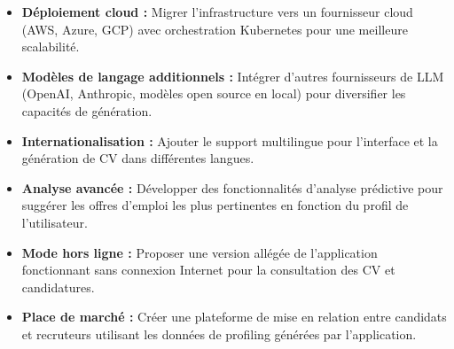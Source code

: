 \begin{itemize}
    \item \textbf{Déploiement cloud :} Migrer l'infrastructure vers un fournisseur cloud (AWS, Azure, GCP) avec orchestration Kubernetes pour une meilleure scalabilité.
    \item \textbf{Modèles de langage additionnels :} Intégrer d'autres fournisseurs de LLM (OpenAI, Anthropic, modèles open source en local) pour diversifier les capacités de génération.
    \item \textbf{Internationalisation :} Ajouter le support multilingue pour l'interface et la génération de CV dans différentes langues.
    \item \textbf{Analyse avancée :} Développer des fonctionnalités d'analyse prédictive pour suggérer les offres d'emploi les plus pertinentes en fonction du profil de l'utilisateur.
    \item \textbf{Mode hors ligne :} Proposer une version allégée de l'application fonctionnant sans connexion Internet pour la consultation des CV et candidatures.
    \item \textbf{Place de marché :} Créer une plateforme de mise en relation entre candidats et recruteurs utilisant les données de profiling générées par l'application.
\end{itemize}
